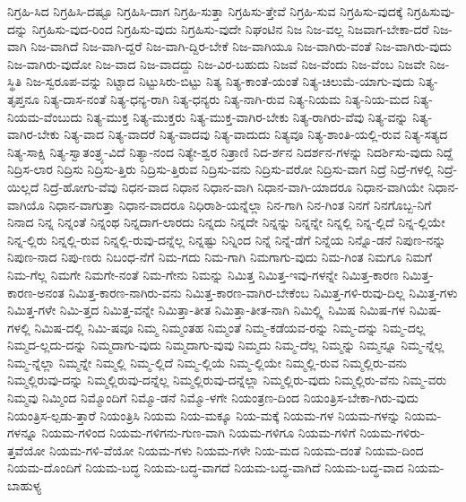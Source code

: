 {ನಿಗ್ರಹಿ-ಸಿದ
ನಿಗ್ರಹಿಸಿ-ದಷ್ಟೂ
ನಿಗ್ರಹಿಸಿ-ದಾಗ
ನಿಗ್ರಹಿ-ಸುತ್ತಾ
ನಿಗ್ರಹಿಸು-ತ್ತೇವೆ
ನಿಗ್ರಹಿ-ಸುವ
ನಿಗ್ರಹಿಸು-ವುದಕ್ಕೆ
ನಿಗ್ರಹಿಸುವು-ದನ್ನು
ನಿಗ್ರಹಿಸು-ವುದ-ರಿಂದ
ನಿಗ್ರಹಿಸು-ವುದು
ನಿಗ್ರಹಿಸು-ವುದೇ
ನಿಘಂಟಿನ
ನಿಜ
ನಿಜ-ವಲ್ಲ
ನಿಜವಾಗ-ಬೇಕಾ-ದರೆ
ನಿಜ-ವಾಗಿ
ನಿಜ-ವಾಗಿದೆ
ನಿಜ-ವಾಗಿ-ದ್ದರೆ
ನಿಜ-ವಾಗಿ-ದ್ದಿರ-ಬೇಕೆ
ನಿಜ-ವಾಗಿಯೂ
ನಿಜ-ವಾಗಿರು-ವಂತೆ
ನಿಜ-ವಾಗಿರು-ವುದು
ನಿಜ-ವಾಗಿರು-ವುದೋ
ನಿಜ-ವಾದ
ನಿಜ-ವಾದದ್ದು
ನಿಜ-ವಿರ-ಬಹುದು
ನಿಜವೆ
ನಿಜ-ವೆಂದು
ನಿಜ-ವೆಂಬ
ನಿಜವೇ
ನಿಜ-ಸ್ಥಿತಿ
ನಿಜ-ಸ್ವರೂಪ-ವನ್ನು
ನಿಟ್ಟಾದ
ನಿಟ್ಟುಸಿರು-ಬಿಟ್ಟು
ನಿತ್ಯ
ನಿತ್ಯ-ಕಾಂತೆ-ಯಂತೆ
ನಿತ್ಯ-ಚಿಲುಮೆ-ಯಾಗು-ವುದು
ನಿತ್ಯ-ತೃಪ್ತನೂ
ನಿತ್ಯ-ದಾಸ-ನಂತೆ
ನಿತ್ಯ-ಧನ್ಯ-ರಾಗಿ
ನಿತ್ಯ-ಧನ್ಯರು
ನಿತ್ಯ-ನಾಗಿ-ರುವ
ನಿತ್ಯ-ನಿಯಮ
ನಿತ್ಯ-ನಿಯ-ಮದ
ನಿತ್ಯ-ನಿಯಮ-ವೆಂಬುದು
ನಿತ್ಯ-ಮುಕ್ತ
ನಿತ್ಯ-ಮುಕ್ತರು
ನಿತ್ಯ-ಮುಕ್ತ-ವಾಗಿರ-ಬೇಕು
ನಿತ್ಯ-ರಾಗಿರು-ವೆವು
ನಿತ್ಯ-ವನ್ನು
ನಿತ್ಯ-ವಾಗಿರ-ಬೇಕು
ನಿತ್ಯ-ವಾದ
ನಿತ್ಯ-ವಾದರೆ
ನಿತ್ಯ-ವಾದವು
ನಿತ್ಯ-ವಾದುದು
ನಿತ್ಯವೂ
ನಿತ್ಯ-ಶಾಂತಿ-ಯಲ್ಲಿ-ರುವ
ನಿತ್ಯ-ಸತ್ಯದ
ನಿತ್ಯ-ಸಾಕ್ಷಿ
ನಿತ್ಯ-ಸ್ವಾತಂತ್ರ್ಯ-ವಿದೆ
ನಿತ್ಯಾ-ನಂದ
ನಿತ್ಯೇ-ಶ್ವರ
ನಿತ್ರಾಣಿ
ನಿದ-ರ್ಶನ
ನಿದರ್ಶನ-ಗಳನ್ನು
ನಿದರ್ಶಿಸು-ವುದು
ನಿದ್ದೆ
ನಿದ್ರಿಸ-ಲಾರ
ನಿದ್ರಿಸು
ನಿದ್ರಿಸು-ತ್ತಿರು
ನಿದ್ರಿಸು-ತ್ತಿರುವ
ನಿದ್ರಿಸು-ವನು
ನಿದ್ರಿಸು-ವರೋ
ನಿದ್ರಿಸು-ವಾಗ
ನಿದ್ರೆ
ನಿದ್ರೆ-ಗಳಲ್ಲಿ
ನಿದ್ರೆ-ಯಿಲ್ಲದೆ
ನಿದ್ರೆ-ಹೋಗು-ವೆವು
ನಿಧನ-ವಾದ
ನಿಧಾನ
ನಿಧಾನ-ವಾಗಿ
ನಿಧಾನ-ವಾಗಿ-ಯಾದರೂ
ನಿಧಾನ-ವಾಗಿಯೇ
ನಿಧಾನ-ವಾಗಿಯೊ
ನಿಧಾನ-ವಾಗುತ್ತಾ
ನಿಧಾನ-ವಾದರೂ
ನಿಧಿರಾಶಿ-ಯನ್ನೆಲ್ಲಾ
ನಿನ-ಗಾಗಿ
ನಿನ-ಗಿಂತ
ನಿನಗೆ
ನಿನಗೊಬ್ಬ-ನಿಗೆ
ನಿನಾದ
ನಿನ್ನ
ನಿನ್ನಂತೆ
ನಿನ್ನಂಥ
ನಿನ್ನದಾಗ-ಲಾರದು
ನಿನ್ನದು
ನಿನ್ನದೇ
ನಿನ್ನನ್ನು
ನಿನ್ನನ್ನೇ
ನಿನ್ನಲ್ಲಿ
ನಿನ್ನ-ಲ್ಲಿದೆ
ನಿನ್ನ-ಲ್ಲಿಯೇ
ನಿನ್ನ-ಲ್ಲಿರು
ನಿನ್ನಲ್ಲಿ-ರುವ
ನಿನ್ನಲ್ಲಿ-ರುವು-ದನ್ನೆಲ್ಲ
ನಿನ್ನಷ್ಟು
ನಿನ್ನಿಂದ
ನಿನ್ನೆ
ನಿನ್ನೆ-ಡೆಗೆ
ನಿನ್ನೆಯ
ನಿನ್ನೊ-ಡನೆ
ನಿಪುಣ-ನನ್ನು
ನಿಪುಣ-ನಾದ
ನಿಪು-ಣರು
ನಿಬಂಧ-ನೆಗೆ
ನಿಮ-ಗದು
ನಿಮ-ಗಾಗಿ
ನಿಮಗಾಗು-ವುದು
ನಿಮ-ಗಿಂತ
ನಿಮಗೂ
ನಿಮಗೆ
ನಿಮ-ಗೆಲ್ಲ
ನಿಮಗೇ
ನಿಮಗೇ-ನಂತೆ
ನಿಮ-ಗೇನು
ನಿಮನ್ನು
ನಿಮಿತ್ತ
ನಿಮಿತ್ತ-ಇವು-ಗಳನ್ನೇ
ನಿಮಿತ್ತ-ಕಾರಣ
ನಿಮಿತ್ತ-ಕಾರಣ-ಅನಂತ
ನಿಮಿತ್ತ-ಕಾರಣ-ನಾಗಿರು-ವನು
ನಿಮಿತ್ತ-ಕಾರಣ-ವಾಗಿರ-ಬೇಕೆಂಬ
ನಿಮಿತ್ತ-ಗಳಿ-ರುವು-ದಿಲ್ಲ
ನಿಮಿತ್ತ-ಗಳು
ನಿಮಿತ್ತ-ಗಳೇ
ನಿಮಿ-ತ್ತದ
ನಿಮಿತ್ತ-ವನ್ನೇ
ನಿಮಿತ್ತಾ-ತೀತ
ನಿಮಿತ್ತಾ-ತೀತ-ನಾಗಿ
ನಿಮಿಲ್ಲ್ಲಿ
ನಿಮಿಷ
ನಿಮಿಷ-ಗಳ
ನಿಮಿಷ-ಗಳಲ್ಲಿ
ನಿಮಿಷ-ದಲ್ಲಿ
ನಿಮಿ-ಷವೂ
ನಿಮ್ಮ
ನಿಮ್ಮಂತಹ
ನಿಮ್ಮಂತೆ
ನಿಮ್ಮ-ಕಡೆಯವ-ರನ್ನು
ನಿಮ್ಮ-ದನ್ನು
ನಿಮ್ಮ-ದಲ್ಲ
ನಿಮ್ಮದ-ಲ್ಲದು-ದನ್ನು
ನಿಮ್ಮದಾಗು-ವುದು
ನಿಮ್ಮದಾಗು-ವುವು
ನಿಮ್ಮದು
ನಿಮ್ಮ-ದೆಲ್ಲ
ನಿಮ್ಮನ್ನು
ನಿಮ್ಮನ್ನೂ
ನಿಮ್ಮ-ನ್ನೆಲ್ಲ
ನಿಮ್ಮ-ನ್ನೆಲ್ಲಾ
ನಿಮ್ಮನ್ನೇ
ನಿಮ್ಮಲ್ಲಿ
ನಿಮ್ಮ-ಲ್ಲಿದೆ
ನಿಮ್ಮ-ಲ್ಲಿಯೆ
ನಿಮ್ಮ-ಲ್ಲಿಯೇ
ನಿಮ್ಮಲ್ಲಿ-ರುವ
ನಿಮ್ಮಲ್ಲಿರು-ವನು
ನಿಮ್ಮಲ್ಲಿರುವು-ದನ್ನು
ನಿಮ್ಮಲ್ಲಿರುವು-ದನ್ನೆಲ್ಲ
ನಿಮ್ಮಲ್ಲಿರುವು-ದನ್ನೆಲ್ಲಾ
ನಿಮ್ಮಲ್ಲಿರು-ವುದು
ನಿಮ್ಮಲ್ಲಿರು-ವೆನು
ನಿಮ್ಮ-ವರು
ನಿಮ್ಮವು
ನಿಮ್ಮಿಂದ
ನಿಮ್ಮೊಂದಿಗೆ
ನಿಮ್ಮೊ-ಡನೆ
ನಿಮ್ಮೊ-ಳಗೇ
ನಿಯಂತ್ರಣ-ದಿಂದ
ನಿಯಂತ್ರಿಸ-ಬೇಕಾ-ಗಿರು-ವುದು
ನಿಯಂತ್ರಿಸ-ಲ್ಪಡು-ತ್ತಾರೆ
ನಿಯಂತ್ರಿಸಿ
ನಿಯಮ
ನಿಯ-ಮಕ್ಕೂ
ನಿಯ-ಮಕ್ಕೆ
ನಿಯಮ-ಗಳ
ನಿಯಮ-ಗಳನ್ನು
ನಿಯಮ-ಗಳನ್ನೂ
ನಿಯಮ-ಗಳಿಂದ
ನಿಯಮ-ಗಳಿಗನು-ಗುಣ-ವಾಗಿ
ನಿಯಮ-ಗಳಿಗೂ
ನಿಯಮ-ಗಳಿಗೆ
ನಿಯಮ-ಗಳಿರು-ತ್ತವೆಯೋ
ನಿಯಮ-ಗಳಿ-ವೆಯೋ
ನಿಯಮ-ಗಳು
ನಿಯಮ-ಗಳೇ
ನಿಯ-ಮದ
ನಿಯಮ-ದಂತೆ
ನಿಯಮ-ದಿಂದ
ನಿಯಮ-ದೊಂದಿಗೆ
ನಿಯಮ-ಬದ್ಧ
ನಿಯಮ-ಬದ್ಧ-ವಾಗದೆ
ನಿಯಮ-ಬದ್ಧ-ವಾಗಿದೆ
ನಿಯಮ-ಬದ್ಧ-ವಾದ
ನಿಯಮ-ಬಾಹುಳ್ಯ
}
